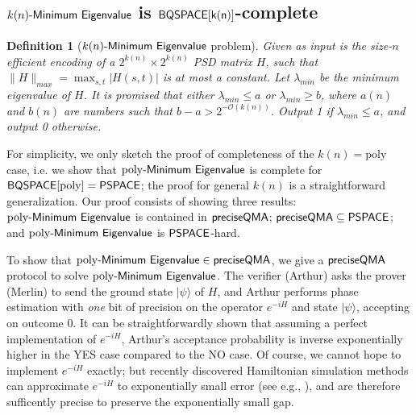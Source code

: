 \documentclass[11pt]{article}
\newtheorem{theorem}[lemma]{Theorem}
\newtheorem{definition}[lemma]{Definition}
\numberwithin{lemma}{section}
\theoremstyle{definition}
\newcommand\BQSPACE{\sf{BQSPACE}}
\newcommand\PSPACE{\sf{PSPACE}}
\newcommand\preciseQMA{{\sf{preciseQMA}}}
\newcommand{\poly}{\mathrm{poly}}
\renewcommand{\le}{\leqslant}
\renewcommand{\ge}{\geqslant}
\newcommand{\ket}[1]{|#1\rangle}
\newcommand\spechamiltonian[1]{#1\textit{\sf{-Minimum Eigenvalue}}}
\begin{document}
\subsection{$\spechamiltonian{k(n)}$ is $\BQSPACE[k(n)]$-complete}
\begin{definition}[$\spechamiltonian{k(n)}$ problem] \label{def: spechamiltonian}
Given as input is the size-$n$ efficient encoding of a $2^{k(n)} \times 2^{k(n)}$ PSD matrix $H$, such that %
$\|H\|_{max} = \max_{s,t}|H(s,t)|$ is at most a constant. Let $\lambda_{min}$ be the minimum eigenvalue of $H$. It is promised that either $\lambda_{min} \le a$ or $\lambda_{min} \ge b$, where $a(n)$ and $b(n)$ are numbers such that $b-a > 2^{-\mathcal{O}(k(n))}$. Output 1 if $\lambda_{min} \le a$, and output 0 otherwise.
\end{definition}


For simplicity, we only sketch the proof of completeness of the $k(n) = \poly$ case, i.e. we show that $\spechamiltonian{\poly}$ is complete for $\BQSPACE[\poly] = \PSPACE$; the proof for general $k(n)$ is a straightforward generalization. Our proof consists of showing three results: $\spechamiltonian{\poly}$ is contained in $\preciseQMA$; $\preciseQMA \subseteq \PSPACE$; and $\spechamiltonian{\poly}$ is $\PSPACE$-hard.

To show that $\spechamiltonian{\poly} \in \preciseQMA$, we give a $\preciseQMA$ protocol to solve $\spechamiltonian{\poly}$. The verifier (Arthur) asks the prover (Merlin) to send the ground state $\ket{\psi}$ of $H$, and Arthur performs phase estimation with \emph{one} bit of precision on the operator $e^{-iH}$ and state $\ket{\psi}$, accepting on outcome 0. It can be straightforwardly shown that assuming a perfect implementation of $e^{-iH}$, Arthur's acceptance probability is inverse exponentially higher in the YES case compared to the NO case. Of course, we cannot hope to implement $e^{-iH}$ exactly; but recently discovered Hamiltonian simulation methods can approximate $e^{-iH}$ to exponentially small error (see e.g., \cite{berry14,berry15}), and are therefore sufficently precise to preserve the exponentially small gap.
\end{document}
